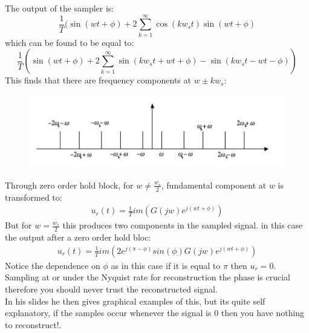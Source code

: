 \documentclass[a4paper,11pt]{article}
\begin{document}
	The output of the sampler is:
	\begin{equation}
		\frac{1}{T}(\sin(wt+\phi)+2\sum\limits_{k=1}^{\infty}\cos(kw_st)\sin(wt+\phi) 
	\end{equation}
	which can be found to be equal to:
	\begin{equation}
		\frac{1}{T}(\sin(wt+\phi)+2\sum\limits_{k=1}^{\infty}\sin(kw_st+wt+\phi) -\sin(kw_st-wt-\phi))
	\end{equation}
	This finds that there are frequency components at $w\pm kw_s$:
	\FloatBarrier
	\begin{figure}[htp]
		\centering
		\includegraphics[scale=0.5]{images/sample_and_hold_freq}
	\end{figure}
	Through zero order hold block, for $w\neq\frac{w_s}{2}$, fundamental component at $w$ is transformed to:
	\begin{eqnarray}
		u_r(t)=\frac{1}{T}im(G(jw)e^{j(wt+\phi)})
	\end{eqnarray}
	But for $w=\frac{w_s}{2}$ this produces two components in the sampled signal. in this case the output after a zero order hold bloc:
	\begin{eqnarray}
		u_r(t)=\frac{1}{T}im(2e^{j(\pi -\phi)}sin(\phi)G(jw)e^{j(wt+\phi)})
	\end{eqnarray}
	Notice the dependence on $\phi$ as in this case if it is equal to $\pi$ then $u_r=0$.\\
	Sampling at or under the Nyquist rate for reconstruction the phase is crucial therefore you should never trust the reconstructed signal.\\
	
	In his slides he then gives graphical examples of this, but its quite self explanatory, if the samples occur whenever the signal is 0 then you have nothing to reconstruct!.
	
	
\end{document}
